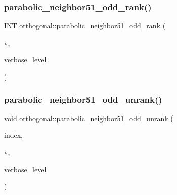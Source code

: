 \subsubsection{\texorpdfstring{parabolic\+\_\+neighbor51\+\_\+odd\+\_\+rank()}{parabolic\_neighbor51\_odd\_rank()}}
{\footnotesize\ttfamily \mbox{\hyperlink{galois_8h_a09fddde158a3a20bd2dcadb609de11dc}{I\+NT}} orthogonal\+::parabolic\+\_\+neighbor51\+\_\+odd\+\_\+rank (\begin{DoxyParamCaption}\item[{\mbox{\hyperlink{galois_8h_a09fddde158a3a20bd2dcadb609de11dc}{I\+NT}} $\ast$}]{v,  }\item[{\mbox{\hyperlink{galois_8h_a09fddde158a3a20bd2dcadb609de11dc}{I\+NT}}}]{verbose\+\_\+level }\end{DoxyParamCaption})}

\mbox{\label{classorthogonal_a302082ae3d38f0a1bf150f1ac5e46942}} 
\subsubsection{\texorpdfstring{parabolic\+\_\+neighbor51\+\_\+odd\+\_\+unrank()}{parabolic\_neighbor51\_odd\_unrank()}}
{\footnotesize\ttfamily void orthogonal\+::parabolic\+\_\+neighbor51\+\_\+odd\+\_\+unrank (\begin{DoxyParamCaption}\item[{\mbox{\hyperlink{galois_8h_a09fddde158a3a20bd2dcadb609de11dc}{I\+NT}}}]{index,  }\item[{\mbox{\hyperlink{galois_8h_a09fddde158a3a20bd2dcadb609de11dc}{I\+NT}} $\ast$}]{v,  }\item[{\mbox{\hyperlink{galois_8h_a09fddde158a3a20bd2dcadb609de11dc}{I\+NT}}}]{verbose\+\_\+level }\end{DoxyParamCaption})}

\mbox{\label{classorthogonal_ac008e55aa06cb631b213ea53851b19e9}} 
